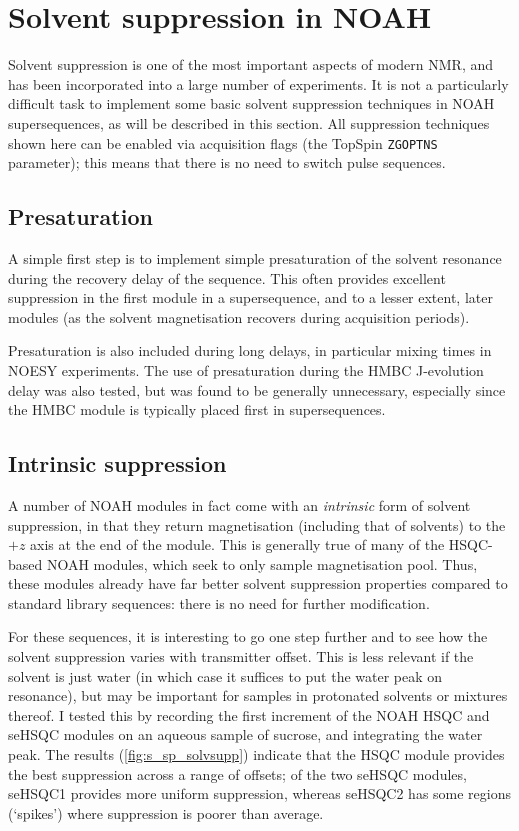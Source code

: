 \section{Solvent suppression in NOAH}
\label{sec:noah__solvsupp}

Solvent suppression is one of the most important aspects of modern NMR, and has been incorporated into a large number of experiments.
It is not a particularly difficult task to implement some basic solvent suppression techniques in NOAH supersequences, as will be described in this section.
All suppression techniques shown here can be enabled via acquisition flags (the TopSpin \texttt{ZGOPTNS} parameter); this means that there is no need to switch pulse sequences.


\subsection{Presaturation}
\label{subsec:noah__solvsupp_presat}

A simple first step is to implement simple presaturation of the solvent resonance during the recovery delay of the sequence.
This often provides excellent suppression in the first module in a supersequence, and to a lesser extent, later modules (as the solvent magnetisation recovers during acquisition periods).

Presaturation is also included during long delays, in particular mixing times in NOESY experiments.
The use of presaturation during the HMBC J-evolution delay was also tested, but was found to be generally unnecessary, especially since the HMBC module is typically placed first in supersequences.


\subsection{Intrinsic suppression}
\label{subsec:noah__solvsupp_intrinsic}

A number of NOAH modules in fact come with an \textit{intrinsic} form of solvent suppression, in that they return  magnetisation (including that of solvents) to the $+z$ axis at the end of the module.
This is generally true of many of the HSQC-based NOAH modules, which seek to only sample  magnetisation pool.
Thus, these modules already have far better solvent suppression properties compared to standard library sequences: there is no need for further modification.

For these sequences, it is interesting to go one step further and to see how the solvent suppression varies with transmitter offset.
This is less relevant if the solvent is just water (in which case it suffices to put the water peak on resonance), but may be important for samples in protonated solvents or mixtures thereof.
I tested this by recording the first increment of the NOAH HSQC and seHSQC modules on an aqueous sample of sucrose, and integrating the water peak.
The results (\cref{fig:s_sp_solvsupp}) indicate that the HSQC module provides the best suppression across a range of offsets; of the two seHSQC modules, seHSQC1 provides more uniform suppression, whereas seHSQC2 has some regions (`spikes') where suppression is poorer than average.

